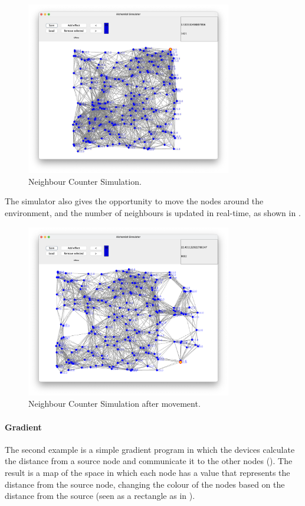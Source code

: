 \begin{figure}[ht!]
    \centering
    \includegraphics[width=0.8\textwidth]{figures/neighborCounter}
    \caption{Neighbour Counter Simulation.}
    \label{fig:neighbour-counter}
\end{figure}

The simulator also gives the opportunity to move the nodes around the environment, and the number of neighbours is updated
in real-time, as shown in .
\begin{figure}[ht!]
    \centering
    \includegraphics[width=0.8\textwidth]{figures/neighborCounterMoved}
    \caption{Neighbour Counter Simulation after movement.}
    \label{fig:neighbor-counter-moved}
\end{figure}

\paragraph{Gradient}
The second example is a simple gradient program in which the devices calculate the distance from a source node and
communicate it to the other nodes ().
The result is a map of the space in which each node has a value that represents the distance from the source node,
changing the colour of the nodes based on the distance from the source (seen as a rectangle as in ).

